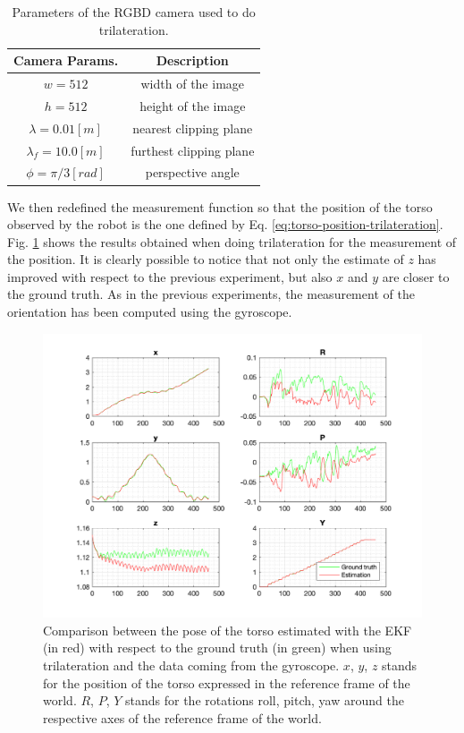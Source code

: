 \documentclass[a4paper]{article}
\begin{document}
\begin{table}
	\centering
	\begin{tabular}{*{2}{c}}
		Camera Params. & Description \\
		\hline
		$w=512$ & width of the image \\
        $h=512$ & height of the image \\
        $\lambda=0.01 [m]$ & nearest clipping plane \\
        $\lambda_f=10.0 [m]$ & furthest clipping plane \\
        $\phi=\pi/3 [rad]$ & perspective angle \\
	\end{tabular}
	\caption{Parameters of the RGBD camera used to do trilateration.}
	\label{table:trilateration-rgbd-params}
\end{table}

We then redefined
the measurement function so that the position of the torso observed by the
robot is the one defined by Eq. \ref{eq:torso-position-trilateration}.
Fig. \ref{fig:comp-ground-truth-estimated-torso} shows the results obtained
when doing trilateration for the measurement of the position. It is
clearly possible to notice that not only the estimate of $z$ has improved with
respect to the previous experiment, but also $x$ and $y$ are closer to the
ground truth. As in the
previous experiments, the measurement of
the orientation has been computed using the gyroscope.

\begin{figure}
    \centering
    \includegraphics[width=\textwidth]{images/trilateration.png}
    \caption{Comparison between the pose of the torso estimated
        with the EKF (in red) with respect to the ground
        truth (in green) when using trilateration and the data coming
        from the gyroscope. $x$, $y$, $z$ stands for the position
        of the torso expressed in the reference frame of the
        world. $R$, $P$, $Y$ stands for the rotations roll,
        pitch, yaw around the respective axes of the
        reference frame of the world.}
    \label{fig:comp-ground-truth-estimated-torso}
\end{figure}
\end{document}
